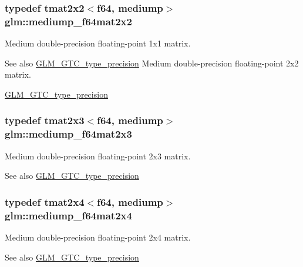 \subsubsection[{mediump\+\_\+f64mat2x2}]{\setlength{\rightskip}{0pt plus 5cm}typedef tmat2x2$<${\bf f64}, mediump$>$ {\bf glm\+::mediump\+\_\+f64mat2x2}}\label{namespaceglm_adc818b8045259f2f2e33e735a9737dae}
Medium double-\/precision floating-\/point 1x1 matrix. \begin{DoxySeeAlso}{See also}
\hyperlink{group__gtc__type__precision}{G\+L\+M\+\_\+\+G\+T\+C\+\_\+type\+\_\+precision} Medium double-\/precision floating-\/point 2x2 matrix. 

\hyperlink{group__gtc__type__precision}{G\+L\+M\+\_\+\+G\+T\+C\+\_\+type\+\_\+precision} 
\end{DoxySeeAlso}
\hypertarget{namespaceglm_aaf979f3ea10f65ed657dc512a4600991}{}
\subsubsection[{mediump\+\_\+f64mat2x3}]{\setlength{\rightskip}{0pt plus 5cm}typedef tmat2x3$<${\bf f64}, mediump$>$ {\bf glm\+::mediump\+\_\+f64mat2x3}}\label{namespaceglm_aaf979f3ea10f65ed657dc512a4600991}
Medium double-\/precision floating-\/point 2x3 matrix. \begin{DoxySeeAlso}{See also}
\hyperlink{group__gtc__type__precision}{G\+L\+M\+\_\+\+G\+T\+C\+\_\+type\+\_\+precision} 
\end{DoxySeeAlso}
\hypertarget{namespaceglm_a75a8c4227dfbe2587b940e623aa3f9c1}{}
\subsubsection[{mediump\+\_\+f64mat2x4}]{\setlength{\rightskip}{0pt plus 5cm}typedef tmat2x4$<${\bf f64}, mediump$>$ {\bf glm\+::mediump\+\_\+f64mat2x4}}\label{namespaceglm_a75a8c4227dfbe2587b940e623aa3f9c1}
Medium double-\/precision floating-\/point 2x4 matrix. \begin{DoxySeeAlso}{See also}
\hyperlink{group__gtc__type__precision}{G\+L\+M\+\_\+\+G\+T\+C\+\_\+type\+\_\+precision} 
\end{DoxySeeAlso}
\hypertarget{namespaceglm_ae38a4a0b57e25d9cbb153dcaab9432ec}{}
